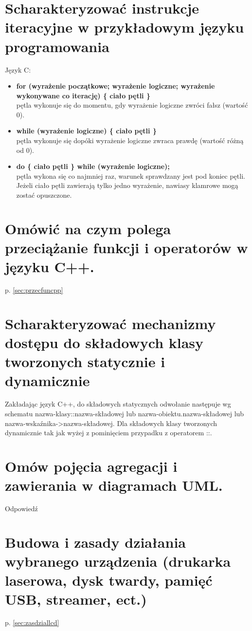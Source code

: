\documentclass[12pt,a4paper]{article}
\begin{document}
	\section{Scharakteryzować instrukcje iteracyjne w przykładowym języku programowania}
	Język C:
	\begin{itemize}
		\item \textbf{for (wyrażenie początkowe; wyrażenie logiczne; wyrażenie wykonywane co iterację) \{ ciało pętli \}}\\
		pętla wykonuje się do momentu, gdy wyrażenie logiczne zwróci fałsz (wartość 0).
	
		\item \textbf{while (wyrażenie logiczne) \{ ciało pętli \}}\\	
		pętla wykonuje się dopóki wyrażenie logiczne zwraca prawdę (wartość różną od 0).
		
		\item \textbf{do \{ ciało pętli \} while (wyrażenie logiczne);}\\
		pętla wykona się co najmniej raz, warunek sprawdzany jest pod koniec pętli. Jeżeli ciało pętli zawierają tylko jedno wyrażenie, nawiasy klamrowe mogą zostać opuszczone.
	\end{itemize}

	\section{Omówić na czym polega przeciążanie funkcji i operatorów w języku C++.}
	p. \ref{sec:przecfuncpp}

	\section{Scharakteryzować mechanizmy dostępu do składowych klasy tworzonych statycznie i dynamicznie}
	Zakładając język C++, do składowych statycznych odwołanie następuje wg schematu nazwa-klasy::nazwa-składowej lub nazwa-obiektu.nazwa-składowej lub nazwa-wskaźnika->nazwa-składowej. Dla składowych klasy tworzonych dynamicznie tak jak wyżej z pominięciem przypadku z operatorem ::.

	\section{Omów pojęcia agregacji i zawierania w diagramach UML.}
	Odpowiedź

	\section{Budowa i zasady działania wybranego urządzenia (drukarka laserowa, dysk twardy, pamięć USB, streamer, ect.)}
	p. \ref{sec:zasdziallcd}
\end{document}
